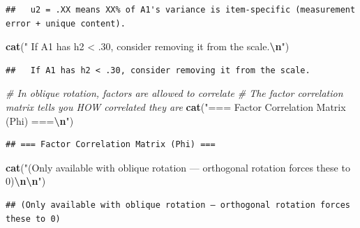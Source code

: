 \documentclass[
]{article}
\newenvironment{Shaded}{\begin{snugshade}}{\end{snugshade}}
\newcommand{\CommentTok}[1]{\textcolor[rgb]{0.56,0.35,0.01}{\textit{#1}}}
\newcommand{\DecValTok}[1]{\textcolor[rgb]{0.00,0.00,0.81}{#1}}
\newcommand{\FunctionTok}[1]{\textcolor[rgb]{0.13,0.29,0.53}{\textbf{#1}}}
\newcommand{\NormalTok}[1]{#1}
\newcommand{\SpecialCharTok}[1]{\textcolor[rgb]{0.81,0.36,0.00}{\textbf{#1}}}
\newcommand{\StringTok}[1]{\textcolor[rgb]{0.31,0.60,0.02}{#1}}
\begin{document}
\begin{verbatim}
##   u2 = .XX means XX% of A1's variance is item-specific (measurement error + unique content).
\end{verbatim}

\begin{Shaded}
\begin{Highlighting}[]
\FunctionTok{cat}\NormalTok{(}\StringTok{"  If A1 has h2 \textless{} .30, consider removing it from the scale.}\SpecialCharTok{\textbackslash{}n}\StringTok{"}\NormalTok{)}
\end{Highlighting}
\end{Shaded}

\begin{verbatim}
##   If A1 has h2 < .30, consider removing it from the scale.
\end{verbatim}

\begin{Shaded}
\begin{Highlighting}[]
\CommentTok{\# In oblique rotation, factors are allowed to correlate}
\CommentTok{\# The factor correlation matrix tells you HOW correlated they are}
\FunctionTok{cat}\NormalTok{(}\StringTok{"=== Factor Correlation Matrix (Phi) ===}\SpecialCharTok{\textbackslash{}n}\StringTok{"}\NormalTok{)}
\end{Highlighting}
\end{Shaded}

\begin{verbatim}
## === Factor Correlation Matrix (Phi) ===
\end{verbatim}

\begin{Shaded}
\begin{Highlighting}[]
\FunctionTok{cat}\NormalTok{(}\StringTok{"(Only available with oblique rotation — orthogonal rotation forces these to 0)}\SpecialCharTok{\textbackslash{}n\textbackslash{}n}\StringTok{"}\NormalTok{)}
\end{Highlighting}
\end{Shaded}

\begin{verbatim}
## (Only available with oblique rotation — orthogonal rotation forces these to 0)
\end{verbatim}

\begin{Shaded}
\end{Shaded}
\end{document}
